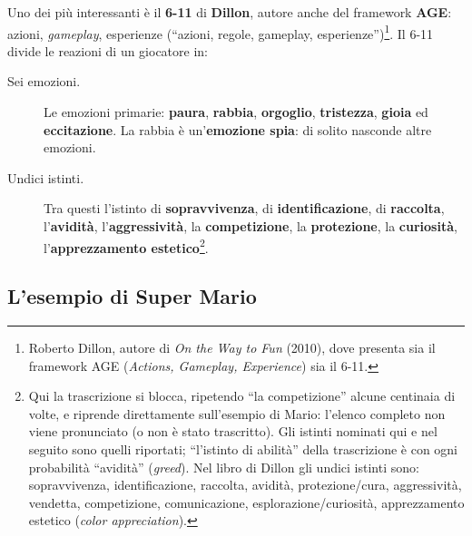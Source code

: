 Uno dei più interessanti è il \textbf{6-11} di \textbf{Dillon}, autore anche del
framework \textbf{AGE}: azioni, \emph{gameplay}, esperienze (``azioni, regole,
gameplay, esperienze'')\footnote{Roberto Dillon, autore di \emph{On the Way to
Fun} (2010), dove presenta sia il framework AGE (\emph{Actions, Gameplay,
Experience}) sia il 6-11.}. Il 6-11 divide le reazioni di un giocatore in:
\begin{description}
  \item[Sei emozioni.] Le emozioni primarie: \textbf{paura}, \textbf{rabbia},
        \textbf{orgoglio}, \textbf{tristezza}, \textbf{gioia} ed
        \textbf{eccitazione}. La rabbia è un'\textbf{emozione spia}: di solito
        nasconde altre emozioni.
  \item[Undici istinti.] Tra questi l'istinto di \textbf{sopravvivenza}, di
        \textbf{identificazione}, di \textbf{raccolta}, l'\textbf{avidità},
        l'\textbf{aggressività}, la \textbf{competizione}, la
        \textbf{protezione}, la \textbf{curiosità}, l'\textbf{apprezzamento
        estetico}\footnote{Qui la trascrizione si blocca, ripetendo ``la
        competizione'' alcune centinaia di volte, e riprende direttamente
        sull'esempio di Mario: l'elenco completo non viene pronunciato (o non è
        stato trascritto). Gli istinti nominati qui e nel seguito sono quelli
        riportati; ``l'istinto di abilità'' della trascrizione è con ogni
        probabilità ``avidità'' (\emph{greed}). Nel libro di Dillon gli undici
        istinti sono: sopravvivenza, identificazione, raccolta, avidità,
        protezione/cura, aggressività, vendetta, competizione, comunicazione,
        esplorazione/curiosità, apprezzamento estetico (\emph{color
        appreciation}).}.
\end{description}

\subsection{L'esempio di Super Mario}


